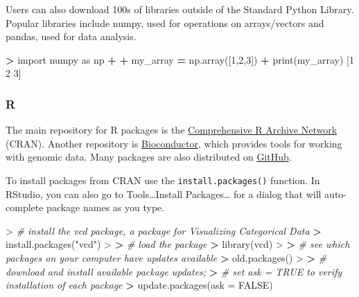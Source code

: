 \documentclass[
]{book}
\newenvironment{Shaded}{\begin{snugshade}}{\end{snugshade}}
\newcommand{\AttributeTok}[1]{\textcolor[rgb]{0.77,0.63,0.00}{#1}}
\newcommand{\BuiltInTok}[1]{#1}
\newcommand{\CommentTok}[1]{\textcolor[rgb]{0.56,0.35,0.01}{\textit{#1}}}
\newcommand{\ConstantTok}[1]{\textcolor[rgb]{0.00,0.00,0.00}{#1}}
\newcommand{\DecValTok}[1]{\textcolor[rgb]{0.00,0.00,0.81}{#1}}
\newcommand{\ErrorTok}[1]{\textcolor[rgb]{0.64,0.00,0.00}{\textbf{#1}}}
\newcommand{\FunctionTok}[1]{\textcolor[rgb]{0.00,0.00,0.00}{#1}}
\newcommand{\ImportTok}[1]{#1}
\newcommand{\NormalTok}[1]{#1}
\newcommand{\OperatorTok}[1]{\textcolor[rgb]{0.81,0.36,0.00}{\textbf{#1}}}
\newcommand{\SpecialCharTok}[1]{\textcolor[rgb]{0.00,0.00,0.00}{#1}}
\newcommand{\StringTok}[1]{\textcolor[rgb]{0.31,0.60,0.02}{#1}}
\begin{document}
Users can also download 100s of libraries outside of the Standard Python Library. Popular libraries include numpy, used for operations on arrays/vectors and pandas, used for data analysis.

\begin{Shaded}
\begin{Highlighting}[]
\OperatorTok{\textgreater{}} \ImportTok{import}\NormalTok{ numpy }\ImportTok{as}\NormalTok{ np}
\OperatorTok{+} 
\OperatorTok{+}\NormalTok{ my\_array }\OperatorTok{=}\NormalTok{ np.array([}\DecValTok{1}\NormalTok{,}\DecValTok{2}\NormalTok{,}\DecValTok{3}\NormalTok{])}
\OperatorTok{+} \BuiltInTok{print}\NormalTok{(my\_array)}
\NormalTok{[}\DecValTok{1} \DecValTok{2} \DecValTok{3}\NormalTok{]}
\end{Highlighting}
\end{Shaded}

\hypertarget{r-3}{%
\subsubsection*{R}\label{r-3}}

The main repository for R packages is the \href{https://cran.r-project.org/}{Comprehensive R Archive Network} (CRAN). Another repository is \href{https://www.bioconductor.org/}{Bioconductor}, which provides tools for working with genomic data. Many packages are also distributed on \href{https://github.com/}{GitHub}.

To install packages from CRAN use the \texttt{install.packages()} function. In RStudio, you can also go to Tools\ldots Install Packages\ldots{} for a dialog that will auto-complete package names as you type.

\begin{Shaded}
\begin{Highlighting}[]
\SpecialCharTok{\textgreater{}} \CommentTok{\# install the vcd package, a package for Visualizing Categorical Data}
\ErrorTok{\textgreater{}} \FunctionTok{install.packages}\NormalTok{(}\StringTok{"vcd"}\NormalTok{)}
\SpecialCharTok{\textgreater{}} 
\ErrorTok{\textgreater{}} \CommentTok{\# load the package}
\ErrorTok{\textgreater{}} \FunctionTok{library}\NormalTok{(vcd)}
\SpecialCharTok{\textgreater{}} 
\ErrorTok{\textgreater{}} \CommentTok{\# see which packages on your computer have updates available}
\ErrorTok{\textgreater{}} \FunctionTok{old.packages}\NormalTok{()}
\SpecialCharTok{\textgreater{}} 
\ErrorTok{\textgreater{}} \CommentTok{\# download and install available package updates;}
\ErrorTok{\textgreater{}} \CommentTok{\# set ask = TRUE to verify installation of each package}
\ErrorTok{\textgreater{}} \FunctionTok{update.packages}\NormalTok{(}\AttributeTok{ask =} \ConstantTok{FALSE}\NormalTok{)}
\end{Highlighting}
\end{Shaded}
\end{document}
